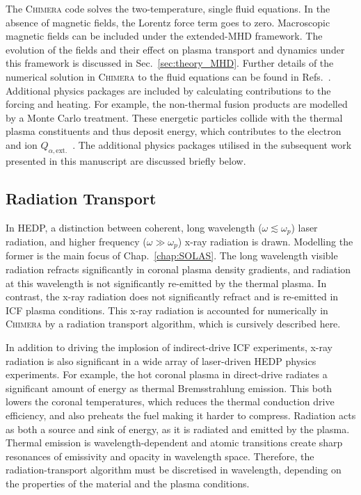 The \textsc{Chimera} code solves the two-temperature, single fluid equations.
In the absence of magnetic fields, the Lorentz force term goes to zero.
Macroscopic magnetic fields can be included under the extended-\ac{MHD} framework.
The evolution of the fields and their effect on plasma transport and dynamics under this framework is discussed in Sec.~\ref{sec:theory_MHD}.
Further details of the numerical solution in \textsc{Chimera} to the fluid equations can be found in Refs.~\cite{chittenden_signatures_2016,walsh_extended_2018,crilly_simulation_2020,farrow_extended_2023,oneill_modelling_2023,chaturvedi_simulating_2024}. 
Additional physics packages are included by calculating contributions to the forcing and heating.
For example, the non-thermal fusion products are modelled by a Monte Carlo treatment.
These energetic particles collide with the thermal plasma constituents and thus deposit energy, which contributes to the electron and ion $Q_{\alpha,\text{ext.}}$~\cite{tong_burn_2019}.
The additional physics packages utilised in the subsequent work presented in this manuscript are discussed briefly below.

\subsection{Radiation Transport}%
\label{sec:theory_radtransp}

In \ac{HEDP}, a distinction between coherent, long wavelength ($\omega \lesssim \omega_p$) laser radiation, and higher frequency ($\omega \gg \omega_p$) x-ray radiation is drawn.
Modelling the former is the main focus of Chap.~\ref{chap:SOLAS}.
The long wavelength visible radiation refracts significantly in coronal plasma density gradients, and radiation at this wavelength is not significantly re-emitted by the thermal plasma.
In contrast, the x-ray radiation does not significantly refract and is re-emitted in \ac{ICF} plasma conditions.
This x-ray radiation is accounted for numerically in \textsc{Chimera} by a radiation transport algorithm, which is cursively described here.

In addition to driving the implosion of indirect-drive \ac{ICF} experiments, x-ray radiation is also significant in a wide array of laser-driven \ac{HEDP} physics experiments.
For example, the hot coronal plasma in direct-drive radiates a significant amount of energy as thermal Bremsstrahlung emission.
This both lowers the coronal temperatures, which reduces the thermal conduction drive efficiency, and also preheats the fuel making it harder to compress.
Radiation acts as both a source and sink of energy, as it is radiated and emitted by the plasma.
Thermal emission is wavelength-dependent and atomic transitions create sharp resonances of emissivity and opacity in wavelength space.
Therefore, the radiation-transport algorithm must be discretised in wavelength, depending on the properties of the material and the plasma conditions.

